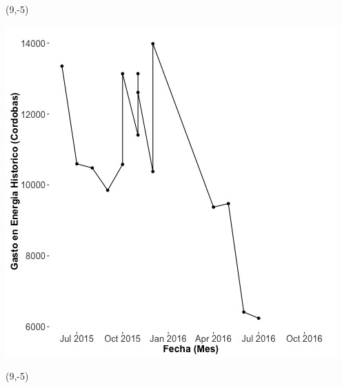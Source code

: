 \documentclass{article}\usepackage[]{graphicx}\usepackage[]{color}
\newenvironment{knitrout}{}{} %
\begin{document}
 \begin{textblock}{1}(9,-5)
\begin{minipage}{20em}
\begingroup

\endgroup
\end{minipage}
\end{textblock}

\begin{knitrout}
\color{fgcolor}
\includegraphics[scale=0.65]{figure/A26_historico_cordobas} 
\end{knitrout}

 \begin{textblock}{1}(9,-5)
\begin{minipage}{20em}
\begingroup

\endgroup
\end{minipage}
\end{textblock}
\end{document}
